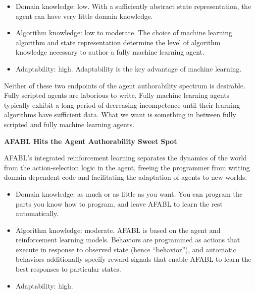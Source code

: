 \begin{itemize}
\item Domain knowledge: low. With a sufficiently abstract state representation, the agent can have very little domain knowledge.
\item Algorithm knowledge: low to moderate.  The choice of machine learning algorithm and state representation determine the level of algorithm knowledge necessary to author a fully machine learning agent.
\item Adaptability: high.  Adaptability is the key advantage of machine learning.
\end{itemize}

Neither of these two endpoints of the agent authorability spectrum is desirable.  Fully scripted agents are laborious to write.  Fully machine learning agents typically exhibit a long period of decreasing incompetence until their learning algorithms have sufficient data.  What we want is something in between fully scripted and fully machine learning agents.


{\bf AFABL Hits the Agent Authorability Sweet Spot}

AFABL's integrated reinforcement learning separates the dynamics of the world from the action-selection logic in the agent, freeing the programmer from writing domain-dependent code and facilitating the adaptation of agents to new worlds.

\begin{itemize}
\item Domain knowledge: as much or as little as you want.  You can program the parts you know how to program, and leave AFABL to learn the rest automatically.
\item Algorithm knowledge: moderate.  AFABL is based on the agent and reinforcement learning models.  Behaviors are programmed as actions that execute in response to observed state (hence ``behavior''), and automatic behaviors additionally specify reward signals that enable AFABL to learn the best responses to particular states.
\item Adaptability: high.
\end{itemize}
